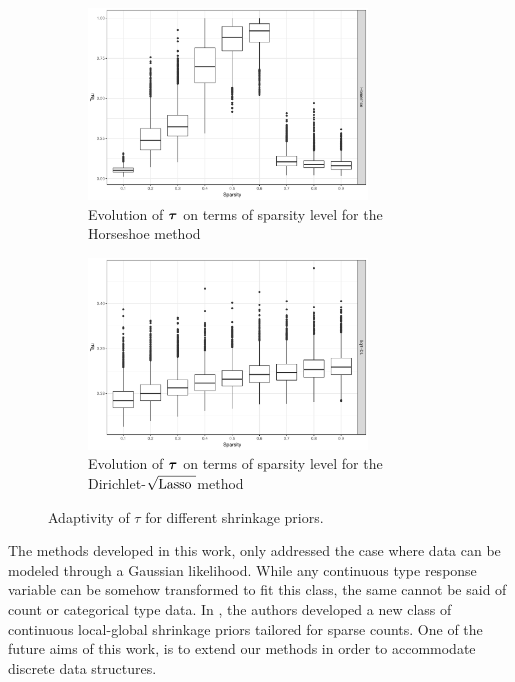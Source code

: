 \documentclass[10pt]{article}
\def\sqdl{Dirichlet-$\sqrt{\text{\rm{Lasso} }}$}
\begin{document}
\begin{figure}[ht!]%
\begin{subfigure}{0.48\linewidth}
\centering
\includegraphics[height=2in]{Tau_hs}\caption{Evolution of $\boldsymbol{\tau}$ on terms of sparsity level for the Horseshoe method}
\label{fig:tau-hs}
\end{subfigure}
\begin{subfigure}{0.48\linewidth}
\centering
\includegraphics[height=2in]{Tau_dl}\caption{Evolution of $\boldsymbol{\tau}$ on terms of sparsity level for the \sqdl method}
\label{fig:tau-dl}
\end{subfigure}
\caption{Adaptivity of $\tau$ for different shrinkage priors.}%
\label{fig:tau}%
\end{figure}

The methods developed in this work, only addressed the case where data can be modeled through a Gaussian likelihood. While any continuous type response variable can be somehow transformed to fit this class, the same cannot be said of count or categorical type data. In \citep{datta2016bayesian}, the authors developed a new class of continuous local-global shrinkage priors tailored for
sparse counts. One of the future aims of this work, is to extend our methods in order to accommodate discrete data structures. 

\end{document}
